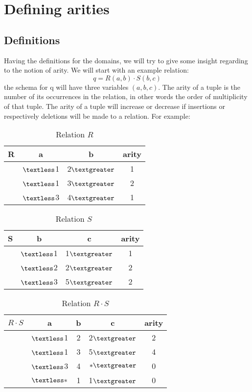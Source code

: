\documentclass[12pt]{article}
\begin{document}
\section{Defining arities}

\subsection{Definitions}

Having the definitions for the domains, we will try to give some insight regarding to the notion of arity. We will start with an example relation: $$q=R(a,b)\cdot S(b,c)$$ the schema for q will have three variables $(a,b,c)$. The arity of a tuple is the number of its occurrences in the relation, in other words the order of multiplicity of that tuple. The arity of a tuple will increase or decrease if insertions or respectively deletions will be made to a relation. For example:
\begin{table}[ht]
\centering
\begin{tabular}{c c c c}
	R & a & b & arity\\ [0.2ex]
	\hline
	  & $\textless $1 & 2$\textgreater$ & 1 \\
	  & $\textless $1 & 3$\textgreater$ & 2 \\
	  & $\textless $3 & 4$\textgreater$ & 1 \\
\end{tabular}
\caption{Relation $R$}
\end{table}
\begin{table}[ht]
\centering
\begin{tabular}{c c c c}
	S & b & c & arity\\ [0.2ex]
	\hline
	  & $\textless $1 & 1$\textgreater$ & 1 \\
	  & $\textless $2 & 2$\textgreater$ & 2 \\
	  & $\textless $3 & 5$\textgreater$ & 2 \\
\end{tabular}
\caption{Relation $S$}
\end{table}
\begin{table}[ht]
\centering
\begin{tabular}{c c c c c}
	$R\cdot S$ & a & b & c & arity\\ [0.2ex]
	\hline
	  & $\textless $1 & 2 & 2$\textgreater$ & 2 \\
	  & $\textless $1 & 3 & 5$\textgreater$ & 4 \\
	  & $\textless $3 & 4 & $*\textgreater$ & 0 \\
	  & $\textless *$ & 1 & 1$\textgreater$ & 0 \\
\end{tabular}
\caption{Relation $R\cdot S$}
\end{table}
\end{document}
